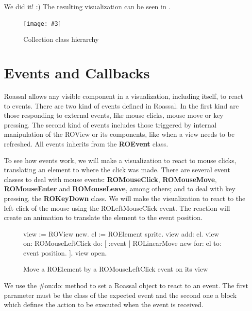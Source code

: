 \documentclass[a4paper,10pt,twoside]{book}
\newcommand{\fig}[4]{
		\begin{figure}[#1]
			\centering
			\texttt{[image: \#3]}
			\caption{\label{fig:#3}#4}
		\end{figure}}
\begin{document}
We did it! :)  The resulting visualization can be seen in .

\fig{H}{0.4}{collectionHierarchy}{Collection class hierarchy}


\section{Events and Callbacks}

Roassal allows any visible component in a visualization, including itself, to react to events. There are two kind of events defined in Roassal. In the first kind are those responding to external events, like mouse clicks, mouse move or key pressing. The second kind of events includes those triggered by internal manipulation of the ROView or its components, like when a view needs to be refreshed.
All events inherits from the \textbf{ROEvent} class.

To see how events work, we will make a visualization to react to mouse clicks, translating an element to where the click was made. 
There are several event classes to deal with mouse events: \textbf{ROMouseClick}, \textbf{ROMouseMove}, \textbf{ROMouseEnter} and \textbf{ROMouseLeave}, among others; and to deal with key pressing, the \textbf{ROKeyDown} class.
We will make the visualization to react to the left click of the mouse using the ROLeftMouseClick event. The reaction will create an animation to translate the element to the event position.

\begin{figure}[H]
      \begin{minipage}[t]{0.61\textwidth}
      \vspace{0pt}
     \begin{code}{}
view := ROView new.
el := ROElement sprite.
view add: el.
view 
	on: ROMouseLeftClick 
	do: [ :event | 
		ROLinearMove new
			for: el to: event position.
	].
view open. 
  \end{code}
   \end{minipage}
   \hfill
\caption{Move a ROElement by a ROMouseLeftClick event on its view}
\label{fig:mouseClick}
\end{figure} 

We use the \#on:do: method to set a Roassal object to react to an event. The first parameter must be the class of the expected event and the second one a block which defines the action to be executed when the event is received.
\end{document}

